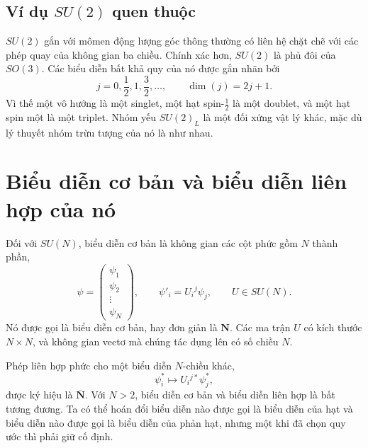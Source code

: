 \subsection{Ví dụ \texorpdfstring{\(SU(2)\)}{SU(2)} quen thuộc}

\(SU(2)\) gắn với mômen động lượng góc thông thường có liên hệ chặt chẽ với các phép quay của không gian ba chiều. Chính xác hơn, \(SU(2)\) là phủ đôi của \(SO(3)\). Các biểu diễn bất khả quy của nó được gắn nhãn bởi
\begin{equation}
j=0,\frac12,1,\frac32,\ldots,
\qquad
\dim(j)=2j+1.
\label{eq:l10-su2-spins}
\end{equation}
Vì thế một vô hướng là một singlet, một hạt spin-\(\tfrac12\) là một doublet, và một hạt spin một là một triplet. Nhóm yếu \(SU(2)_L\) là một đối xứng vật lý khác, mặc dù lý thuyết nhóm trừu tượng của nó là như nhau.

\section{Biểu diễn cơ bản và biểu diễn liên hợp của nó}

Đối với \(SU(N)\), biểu diễn cơ bản là không gian các cột phức gồm \(N\) thành phần,
\begin{equation}
\psi=
\begin{pmatrix}
\psi_1\\
\psi_2\\
\vdots\\
\psi_N
\end{pmatrix},
\qquad
\psi'_i=U_i{}^j\psi_j,
\qquad
U\in SU(N).
\label{eq:l10-defining}
\end{equation}
Nó được gọi là biểu diễn cơ bản, hay đơn giản là \(\mathbf N\). Các ma trận \(U\) có kích thước \(N\times N\), và không gian vectơ mà chúng tác dụng lên có số chiều \(N\).

Phép liên hợp phức cho một biểu diễn \(N\)-chiều khác,
\begin{equation}
\psi_i^*\longmapsto U_i{}^{j*}\psi_j^*,
\label{eq:l10-conjugate}
\end{equation}
được ký hiệu là \(\overline{\mathbf N}\). Với \(N>2\), biểu diễn cơ bản và biểu diễn liên hợp là bất tương đương. Ta có thể hoán đổi biểu diễn nào được gọi là biểu diễn của hạt và biểu diễn nào được gọi là biểu diễn của phản hạt, nhưng một khi đã chọn quy ước thì phải giữ cố định.

\begin{classroomqa}
\end{classroomqa}

